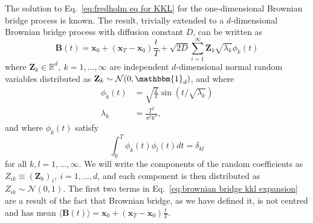 The solution to Eq.~\ref{eq:fredholm eq for KKL} for the one-dimensional Brownian bridge process is known. The result, trivially extended to a $d$-dimensional Brownian bridge process with diffusion constant $D$, can be written as
\begin{equation} \label{eq:brownian bridge kkl expansion}
	\mathbf{B}(t) = \mathbf{x}_0 + (\mathbf{x}_T - \mathbf{x}_0) \frac{t}{T} +\sqrt{2 D} \sum_{i=1}^\infty \mathbf{Z}_k \sqrt{\lambda_k} \phi_k(t)
\end{equation}
where $\mathbf{Z}_k \in \mathbb{R}^d,\ k =1,\dots,\infty$ are independent $d$-dimensional normal random variables distributed as $\mathbf{Z}_k \sim \mathcal{N}(0, \mathbbm{1}_d)$, and where
\begin{subequations} \label{eq:KKL basis Brownian bridge}
	\begin{align}
		\phi_k(t) & = \sqrt{\frac{2}{T}} \sin (t / \sqrt{\lambda_k}) \\
		\lambda_k & = \frac{T^2}{\pi^2 k^2},
	\end{align}
\end{subequations}
and where $\phi_k(t)$ satisfy
\begin{equation}
	\int_0^T \phi_k(t) \phi_l(t) dt = \delta_{kl}
\end{equation}
for all $k,l=1,\dots, \infty$. We will write the components of the random coefficients as $Z_{ik} \equiv (\mathbf{Z}_k)_i,\ i=1,\dots,d$, and each component is then distributed as $Z_{ik} \sim \mathcal{N}(0, 1)$. The first two terms in Eq.~\ref{eq:brownian bridge kkl expansion} are a result of the fact that Brownian bridge, as we have defined it, is not centred and has mean $\langle \mathbf{B}(t) \rangle = \mathbf{x}_0 + (\mathbf{x}_T - \mathbf{x}_0) \frac{t}{T}$.

